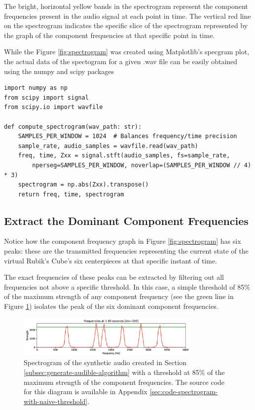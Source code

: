 The bright, horizontal yellow bands in the spectrogram represent the component frequencies present in the audio signal at each point in time.
The vertical red line on the spectrogram indicates the specific slice of the spectrogram represented by the graph of the component frequencies at that specific point in time.

While the Figure \ref{fig:spectrogram} was created using Matplotlib's specgram plot, the actual data of the spectogram for a given .wav file can be easily obtained using the numpy and scipy packages

\begin{verbatim}
import numpy as np
from scipy import signal
from scipy.io import wavfile

def compute_spectrogram(wav_path: str):
    SAMPLES_PER_WINDOW = 1024  # Balances frequency/time precision
    sample_rate, audio_samples = wavfile.read(wav_path)
    freq, time, Zxx = signal.stft(audio_samples, fs=sample_rate,
        nperseg=SAMPLES_PER_WINDOW, noverlap=(SAMPLES_PER_WINDOW // 4) * 3)
    spectrogram = np.abs(Zxx).transpose()
    return freq, time, spectrogram
\end{verbatim}

\newpage
\subsection{Extract the Dominant Component Frequencies}
\label{subsec:extract-dominant-freqs}
Notice how the component frequency graph in Figure \ref{fig:spectrogram} has six peaks: these are the transmitted frequencies representing the current state of the virtual Rubik's Cube's six centerpieces at that specific instant of time.

The exact frequencies of these peaks can be extracted by filtering out all frequencies not above a specific threshold.
In this case, a simple threshold of 85\% of the maximum strength of any component frequency (see the green line in Figure \ref{fig:spectrogram-with-naive-threshold}) isolates the peak of the six dominant component frequencies.

\begin{figure}[h]
    \centering
    \includegraphics[width=0.8\textwidth]{Figures/5 Algorithm Design/threshold.png}
    \caption{Spectrogram of the synthetic audio created in Section \ref{subsec:generate-audible-algorithm} with a threshold at 85\% of the maximum strength of the component frequencies. The source code for this diagram is available in Appendix \ref{sec:code-spectrogram-with-naive-threshold}.}
    \label{fig:spectrogram-with-naive-threshold}
\end{figure}

